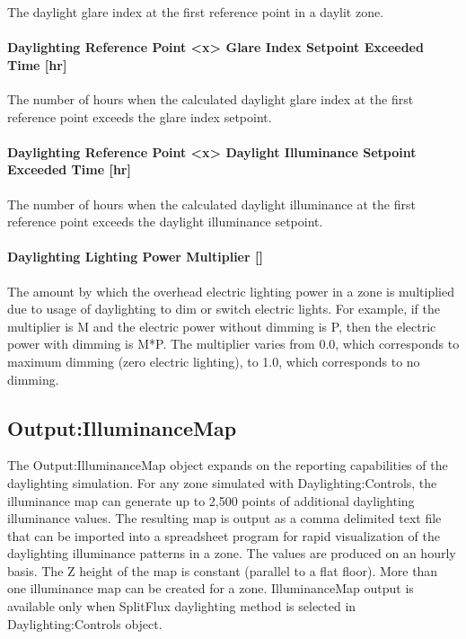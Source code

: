 The daylight glare index at the first reference point in a daylit zone.

\paragraph{Daylighting Reference Point <x> Glare Index Setpoint Exceeded Time {[}hr{]}}\label{daylighting-reference-point-1-glare-index-setpoint-exceeded-time-hr}

The number of hours when the calculated daylight glare index at the first reference point exceeds the glare index setpoint.

\paragraph{Daylighting Reference Point <x> Daylight Illuminance Setpoint Exceeded Time {[}hr{]}}\label{daylighting-reference-point-1-daylight-illuminance-setpoint-exceeded-time-hr}

The number of hours when the calculated daylight illuminance at the first reference point exceeds the daylight illuminance setpoint.

\paragraph{Daylighting Lighting Power Multiplier {[]}}\label{daylighting-lighting-power-multiplier-1}

The amount by which the overhead electric lighting power in a zone is multiplied due to usage of daylighting to dim or switch electric lights. For example, if the multiplier is M and the electric power without dimming is P, then the electric power with dimming is M*P. The multiplier varies from 0.0, which corresponds to maximum dimming (zero electric lighting), to 1.0, which corresponds to no dimming.

\subsection{Output:IlluminanceMap}\label{outputilluminancemap}

The Output:IlluminanceMap object expands on the reporting capabilities of the daylighting simulation. For any zone simulated with Daylighting:Controls, the illuminance map can generate up to 2,500 points of additional daylighting illuminance values. The resulting map is output as a comma delimited text file that can be imported into a spreadsheet program for rapid visualization of the daylighting illuminance patterns in a zone. The values are produced on an hourly basis. The Z height of the map is constant (parallel to a flat floor). More than one illuminance map can be created for a zone. IlluminanceMap output is available only when SplitFlux daylighting method is selected in Daylighting:Controls object.

